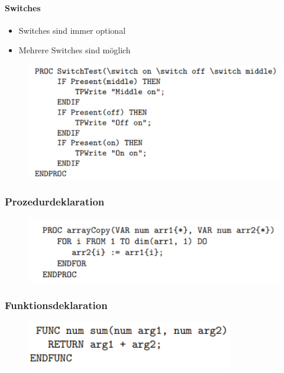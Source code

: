 \paragraph{Switches}
\begin{itemize}
	\item Switches sind immer optional
	\item Mehrere Switches sind möglich
\end{itemize}
\begin{figure}[H]
	\begin{center}
		\includegraphics[scale=0.9]{resources/PNG/Syntax2.PNG}
		\caption{}
		\label{fig:resources/PNG/Syntax2.PNG}
	\end{center}
\end{figure}
\subsubsection{Prozedurdeklaration}
\begin{figure}[H]
	\begin{center}
		\includegraphics[scale=0.9]{resources/PNG/Syntax3.PNG}
		\caption{}
		\label{fig:resources/PNG/Syntax3.PNG}
	\end{center}
\end{figure}
\subsubsection{Funktionsdeklaration}
\begin{figure}[H]
	\begin{center}
		\includegraphics[scale=0.9]{resources/PNG/Syntax4.PNG}
		\caption{}
		\label{fig:resources/PNG/Syntax4.PNG}
	\end{center}
\end{figure}
